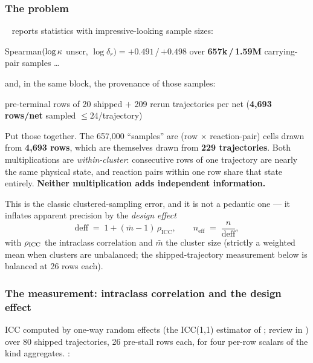 \subsubsection{The problem}
\label{sec:clusterrobust-problem}

\begin{warn}
\warnglyph{}~ reports statistics with impressive-looking sample
sizes:

Spearman$(\log\kappa$ unscr, $\log\delta_r) = \mathbf{+0.491}$\,/\,$\mathbf{+0.498}$
over \textbf{657k\,/\,1.59M} carrying-pair samples \ldots
{}

and, in the same block, the provenance of those samples:

pre-terminal rows of 20 shipped $+$ 209 rerun trajectories per net
(\textbf{4,693 rows/net} sampled $\le 24$/trajectory)
\end{warn}

Put those together. The 657,000 ``samples'' are (row $\times$ reaction-pair)
cells drawn from \textbf{4,693 rows}, which are themselves drawn from
\textbf{229 trajectories}. Both multiplications are \emph{within-cluster}:
consecutive rows of one trajectory are nearly the same physical state, and
reaction pairs within one row share that state entirely. \textbf{Neither
multiplication adds independent information.}

This is the classic clustered-sampling error, and it is not a pedantic one ---
it inflates apparent precision by the \emph{design effect} \citep{kish1965}
%
\begin{equation}
\text{deff} \;=\; 1 + (\bar m - 1)\,\rho_{\mathrm{ICC}}, \qquad
n_{\mathrm{eff}} \;=\; \frac{n}{\text{deff}},
\label{eq:deff}
\end{equation}
%
with $\rho_{\rm ICC}$ the intraclass correlation and $\bar m$ the cluster size
(strictly a weighted mean when clusters are unbalanced; the shipped-trajectory
measurement below is balanced at 26 rows each).

\subsubsection{The measurement: intraclass correlation and the design effect}
\label{sec:clusterrobust-measurement}

ICC computed by one-way random effects (the ICC(1,1) estimator of
\citealp{shrout1979}; review in \citealp{donner1986}) over 80 shipped 
trajectories, 26 pre-stall rows each, for four per-row scalars of the kind
 aggregates. \derivedhere:

